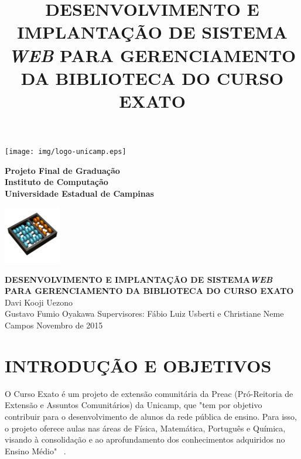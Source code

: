 \documentclass[a4paper]{article}
\title{DESENVOLVIMENTO E IMPLANTAÇÃO DE SISTEMA \textit{WEB} PARA GERENCIAMENTO DA BIBLIOTECA DO CURSO EXATO}
\begin{document}
\begin{minipage}[t|]{14mm}
\texttt{[image: img/logo-unicamp.eps]}
\end{minipage}
\hfill
\begin{minipage}[tl]{120mm}
\begin{center}
{\bf \sc Projeto Final de Graduação}\\
{\bf \sc Instituto de Computação} \\
{\bf \sc Universidade Estadual de Campinas} \\
\end{center}
\end{minipage}
\hfill
\begin{minipage}[c]{25mm}
\thispagestyle{empty}
\hspace{-0.5cm}
\includegraphics[width=25mm]{img/logo-ic.png}
\end{minipage}
\vfill\vfill
\begin{center}
\Huge{\textbf{DESENVOLVIMENTO E IMPLANTAÇÃO DE SISTEMA\textit{WEB} PARA GERENCIAMENTO DA BIBLIOTECA DO CURSO EXATO}}
\vfill\vfill
\huge{Davi Kooji Uezono\\Gustavo Fumio Oyakawa}
\vfill
\Large{Supervisores: Fábio Luiz Usberti e Christiane Neme Campos}
\vfill\vfill
\Large{Novembro de 2015}
\end{center}
\vfill


\pagebreak
\setcounter{page}{1}
\section{INTRODUÇÃO E OBJETIVOS}

O Curso Exato é um projeto de extensão comunitária da Preac (Pró-Reitoria de Extensão e Assuntos Comunitários) da Unicamp, que "tem por objetivo contribuir para o desenvolvimento de alunos da rede pública de ensino. Para isso, o projeto oferece aulas nas áreas de Física, Matemática, Português e Química, visando à consolidação e ao aprofundamento dos conhecimentos adquiridos no Ensino Médio" \ \cite{cursoexato}.
\end{document}
